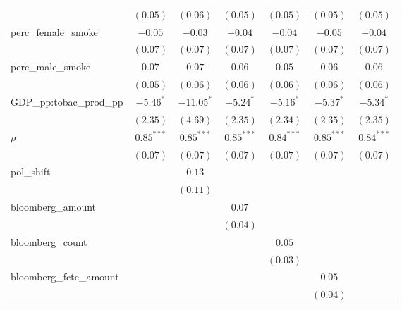 \begin{table}[!h]
\begin{center}
\begin{tabular}{l c c c c c c }
                        & $(0.05)$     & $(0.06)$     & $(0.05)$     & $(0.05)$     & $(0.05)$     & $(0.05)$     \\
perc\_female\_smoke     & $-0.05$      & $-0.03$      & $-0.04$      & $-0.04$      & $-0.05$      & $-0.04$      \\
                        & $(0.07)$     & $(0.07)$     & $(0.07)$     & $(0.07)$     & $(0.07)$     & $(0.07)$     \\
perc\_male\_smoke       & $0.07$       & $0.07$       & $0.06$       & $0.05$       & $0.06$       & $0.06$       \\
                        & $(0.05)$     & $(0.06)$     & $(0.06)$     & $(0.06)$     & $(0.06)$     & $(0.06)$     \\
GDP\_pp:tobac\_prod\_pp & $-5.46^{*}$  & $-11.05^{*}$ & $-5.24^{*}$  & $-5.16^{*}$  & $-5.37^{*}$  & $-5.34^{*}$  \\
                        & $(2.35)$     & $(4.69)$     & $(2.35)$     & $(2.34)$     & $(2.35)$     & $(2.35)$     \\
$\rho$                  & $0.85^{***}$ & $0.85^{***}$ & $0.85^{***}$ & $0.84^{***}$ & $0.85^{***}$ & $0.84^{***}$ \\
                        & $(0.07)$     & $(0.07)$     & $(0.07)$     & $(0.07)$     & $(0.07)$     & $(0.07)$     \\
pol\_shift              &              & $0.13$       &              &              &              &              \\
                        &              & $(0.11)$     &              &              &              &              \\
bloomberg\_amount       &              &              & $0.07$       &              &              &              \\
                        &              &              & $(0.04)$     &              &              &              \\
bloomberg\_count        &              &              &              & $0.05$       &              &              \\
                        &              &              &              & $(0.03)$     &              &              \\
bloomberg\_fctc\_amount &              &              &              &              & $0.05$       &              \\
                        &              &              &              &              & $(0.04)$     &              \\

\end{tabular}
\end{center}
\end{table}
